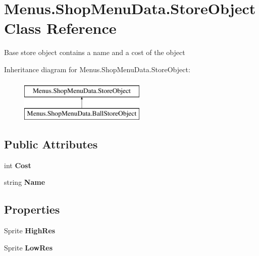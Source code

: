 \hypertarget{class_menus_1_1_shop_menu_data_1_1_store_object}{}\section{Menus.\+Shop\+Menu\+Data.\+Store\+Object Class Reference}
\label{class_menus_1_1_shop_menu_data_1_1_store_object}


Base store object contains a name and a cost of the object  


Inheritance diagram for Menus.\+Shop\+Menu\+Data.\+Store\+Object\+:\begin{figure}[H]
\begin{center}
\leavevmode
\includegraphics[height=2.000000cm]{class_menus_1_1_shop_menu_data_1_1_store_object}
\end{center}
\end{figure}
\subsection*{Public Attributes}
\begin{DoxyCompactItemize}
\item 
int {\bfseries Cost}\hypertarget{class_menus_1_1_shop_menu_data_1_1_store_object_a7a7b36b71c978cb11dda711ea66f7eb3}{}\label{class_menus_1_1_shop_menu_data_1_1_store_object_a7a7b36b71c978cb11dda711ea66f7eb3}

\item 
string {\bfseries Name}\hypertarget{class_menus_1_1_shop_menu_data_1_1_store_object_ae8a3658a4964a9a67b1de0fbee128869}{}\label{class_menus_1_1_shop_menu_data_1_1_store_object_ae8a3658a4964a9a67b1de0fbee128869}

\end{DoxyCompactItemize}
\subsection*{Properties}
\begin{DoxyCompactItemize}
\item 
Sprite {\bfseries High\+Res}\hypertarget{class_menus_1_1_shop_menu_data_1_1_store_object_a14be1f6f44cedb1b46260ffe9197f856}{}\label{class_menus_1_1_shop_menu_data_1_1_store_object_a14be1f6f44cedb1b46260ffe9197f856}

\item 
Sprite {\bfseries Low\+Res}\hypertarget{class_menus_1_1_shop_menu_data_1_1_store_object_af86650045d1d10d13bb22246b92e0a2e}{}\label{class_menus_1_1_shop_menu_data_1_1_store_object_af86650045d1d10d13bb22246b92e0a2e}

\end{DoxyCompactItemize}


